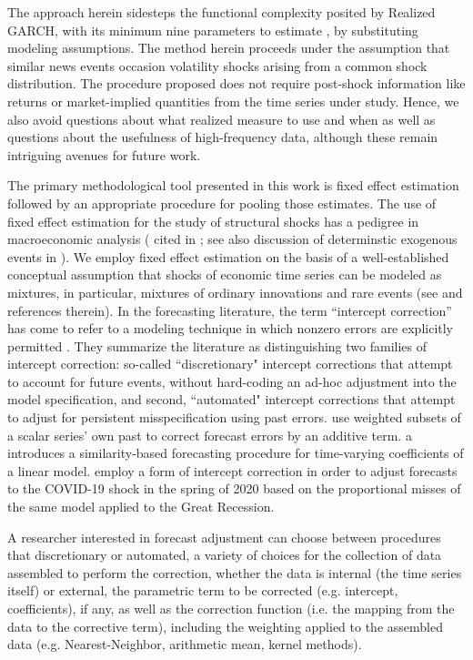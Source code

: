 \documentclass[11pt,3p,review,authoryear]{elsarticle}
\theoremstyle{definition}
\begin{document}
The approach herein sidesteps the functional complexity posited by Realized GARCH, with its minimum nine parameters to estimate \citep{sharma2016forecasting}, by substituting modeling assumptions.  The method herein proceeds under the assumption that similar news events occasion volatility shocks arising from a common shock distribution.  The procedure proposed does not require post-shock information like returns or market-implied quantities from the time series under study.  Hence, we also avoid questions about what realized measure to use and when as well as questions about the usefulness of high-frequency data, although these remain intriguing avenues for future work.

The primary methodological tool presented in this work is fixed effect estimation followed by an appropriate procedure for pooling those estimates.  The use of fixed effect estimation for the study of structural shocks has a pedigree in macroeconomic analysis (\citet{romer1989does} cited in \citet{kilian2017structural}; see also discussion of determinstic exogenous events in \citet{engle2001good}).  We employ fixed effect estimation on the basis of a well-established conceptual assumption that shocks of economic time series can be modeled as mixtures, in particular, mixtures of ordinary innovations and rare events (see \cite{phillips1996forecasting} and references therein).  In the forecasting literature, the term ``intercept correction'' has come to refer to a modeling technique in which nonzero errors are explicitly permitted \citep{hendry1994theory, clements1998forecasting}.  They summarize the literature as distinguishing two families of intercept correction: so-called ``discretionary" intercept corrections that attempt to account for future events, without hard-coding an ad-hoc adjustment into the model specification, and second, ``automated" intercept corrections that attempt to adjust for persistent misspecification using past errors.  \citet{guerron2017macroeconomic} use weighted subsets of a scalar series' own past to correct forecast errors by an additive term. \citet{dendramis2020similarity} a introduces a similarity-based forecasting procedure for time-varying coefficients of a linear model. \citet{foroni2022forecasting} employ a form of intercept correction in order to adjust forecasts to the COVID-19 shock in the spring of 2020 based on the proportional misses of the same model applied to the Great Recession.

A researcher interested in forecast adjustment can choose between procedures that discretionary or automated, a variety of choices for the collection of data assembled to perform the correction, whether the data is internal (the time series itself) or external, the parametric term to be corrected (e.g. intercept, coefficients), if any, as well as the correction function (i.e. the mapping from the data to the corrective term), including the weighting applied to the assembled data (e.g. Nearest-Neighbor, arithmetic mean, kernel methods).
\end{document}
